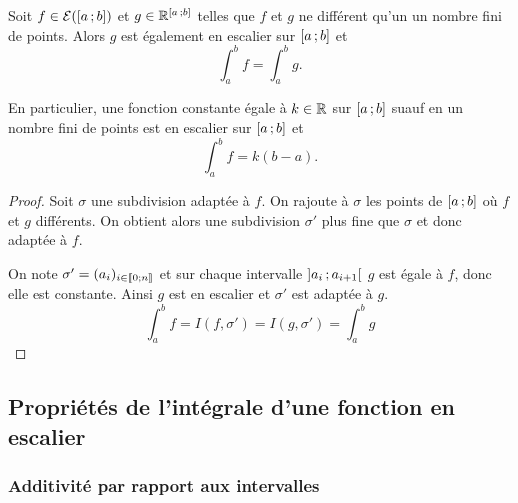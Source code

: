 \begin{prop}
  Soit $f \in \mathcal{E}(\left[ a \, ;  b \right])$ et $g \in \mathbb{R}^{\left[ a \, ;  b \right]}$ telles que $f$ et $g$ ne différent qu'un un nombre fini de points. Alors $g$ est également en escalier sur $\left[ a \, ;  b \right]$ et
  \begin{equation}
    \int_a^b f = \int_a^b g.
  \end{equation}
\end{prop}
En particulier, une fonction constante égale à $k \in \mathbb{R}$ sur $\left[ a \, ;  b \right]$ suauf en un nombre fini de points est en escalier sur $\left[ a \, ;  b \right]$ et
\begin{equation}
  \int_a^b f =k(b-a).
\end{equation}

\begin{proof}
  Soit $\sigma$ une subdivision adaptée à $f$. On rajoute à $\sigma$ les points de $\left[ a \, ;  b \right]$ où $f$ et $g$ différents. On obtient alors une subdivision $\sigma'$ plus fine que $\sigma$ et donc adaptée à $f$.

  On note $\sigma'=(a_i)_{i \in \mathopen{\llbracket}0\mathclose{}\mathpunct{};n\mathclose{\rrbracket}}$ et sur chaque intervalle $\left] a_i \, ;  a_{i+1} \right[$ $g$ est égale à $f$, donc elle est constante. Ainsi $g$ est en escalier et $\sigma'$ est adaptée à $g$.
  \begin{equation}
    \int_a^bf = I(f,\sigma')=I(g,\sigma')=\int_a^bg
  \end{equation}
\end{proof}

\subsection{Propriétés de l'intégrale d'une fonction en escalier}

\subsubsection{Additivité par rapport aux intervalles}

